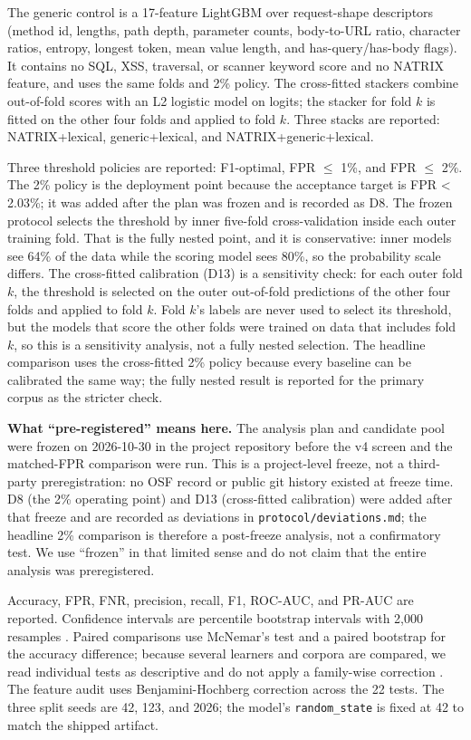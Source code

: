 \documentclass[preprint,11pt]{elsarticle}
\begin{document}
The generic control is a 17-feature LightGBM over request-shape
descriptors (method id, lengths, path depth, parameter counts,
body-to-URL ratio, character ratios, entropy, longest token, mean value
length, and has-query/has-body flags). It contains no SQL, XSS,
traversal, or scanner keyword score and no NATRIX feature, and uses the
same folds and 2\% policy. The cross-fitted stackers combine out-of-fold
scores with an L2 logistic model on logits; the stacker for fold \(k\)
is fitted on the other four folds and applied to fold \(k\). Three
stacks are reported: NATRIX+lexical, generic+lexical, and
NATRIX+generic+lexical.

Three threshold policies are reported: F1-optimal, FPR $\le$ 1\%,
and FPR $\le$ 2\%. The 2\% policy is the deployment point because
the acceptance target is FPR \textless{} 2.03\%; it was added after the
plan was frozen and is recorded as D8. The frozen protocol selects the
threshold by inner five-fold cross-validation inside each outer training
fold. That is the fully nested point, and it is conservative: inner
models see 64\% of the data while the scoring model sees 80\%, so the
probability scale differs. The cross-fitted calibration (D13) is a
sensitivity check: for each outer fold \(k\), the threshold is selected
on the outer out-of-fold predictions of the other four folds and applied
to fold \(k\). Fold \(k\)'s labels are never used to select its
threshold, but the models that score the other folds were trained on
data that includes fold \(k\), so this is a sensitivity analysis, not a
fully nested selection. The headline comparison uses the cross-fitted
2\% policy because every baseline can be calibrated the same way; the
fully nested result is reported for the primary corpus as the stricter
check.

\textbf{What ``pre-registered'' means here.} The analysis plan and
candidate pool were frozen on 2026-10-30 in the project repository
before the v4 screen and the matched-FPR comparison were run. This is a
project-level freeze, not a third-party preregistration: no OSF record
or public git history existed at freeze time. D8 (the 2\% operating
point) and D13 (cross-fitted calibration) were added after that freeze
and are recorded as deviations in \texttt{protocol/\allowbreak{}deviations.\allowbreak{}md}; the
headline 2\% comparison is therefore a post-freeze analysis, not a
confirmatory test. We use ``frozen'' in that limited sense and do not
claim that the entire analysis was preregistered.

Accuracy, FPR, FNR, precision, recall, F1, ROC-AUC, and PR-AUC are
reported. Confidence intervals are percentile bootstrap intervals with
2,000 resamples \citep{efron1993introduction}. Paired comparisons use
McNemar's test \citep{mcnemar1947note} and a paired bootstrap for the
accuracy difference; because several learners and corpora are compared,
we read individual tests as descriptive and do not apply a family-wise
correction \citep{demsar2006statistical}. The feature audit uses
Benjamini-Hochberg correction across the 22 tests. The three split seeds
are 42, 123, and 2026; the model's \texttt{random\_\allowbreak{}state} is fixed at 42
to match the shipped artifact.
\end{document}
